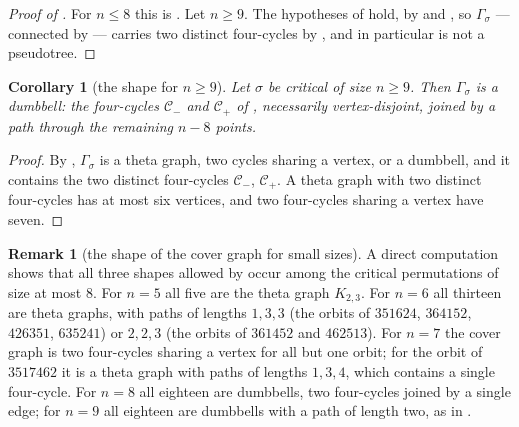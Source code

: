 \documentclass[12pt]{article}
\newtheorem{corollary}[corollary]{Corollary}
\theoremstyle{definition}
\newtheorem{remark}[remark]{Remark}
\newcommand{\cyclem}{\mathcal{C}_-}
\newcommand{\cyclep}{\mathcal{C}_+}
\newcommand{\cgr}{\Gamma}                 %
\begin{document}
\begin{proof}[Proof of ]
For $n \le 8$ this is . Let $n \ge 9$. The hypotheses of
 hold, by  and
, so $\cgr_\sigma$ --- connected by
 --- carries two distinct four-cycles by
, and in particular is not a pseudotree.
\end{proof}

\begin{corollary}[the shape for $n \ge 9$]\label{cor:dumbbell}
Let $\sigma$ be critical of size $n \ge 9$. Then $\cgr_\sigma$ is a dumbbell:
the four-cycles $\cyclem$ and $\cyclep$ of , necessarily
vertex-disjoint, joined by a path through the remaining $n-8$ points.
\end{corollary}

\begin{proof}
By , $\cgr_\sigma$ is a theta graph, two cycles sharing a
vertex, or a dumbbell, and it contains the two distinct four-cycles $\cyclem$,
$\cyclep$. A theta graph with two distinct four-cycles has at most six
vertices, and two four-cycles sharing a vertex have seven.
\end{proof}

\begin{remark}[the shape of the cover graph for small sizes]\label{rem:smallshape}
A direct computation shows that all three shapes allowed by
 occur among the critical permutations of
size at most $8$. For $n = 5$ all five are the theta graph $K_{2,3}$. For
$n = 6$ all thirteen are theta graphs, with paths of lengths $1,3,3$ (the
orbits of $351624$, $364152$, $426351$, $635241$) or $2,2,3$ (the orbits of
$361452$ and $462513$). For $n = 7$ the cover graph is two four-cycles
sharing a vertex for all but one orbit; for the orbit of $3517462$ it is a theta graph with paths of
lengths $1,3,4$, which contains a single four-cycle. For $n = 8$ all
eighteen are dumbbells, two four-cycles joined by a single edge; for $n = 9$
all eighteen are dumbbells with a path of length two, as in
.
\end{remark}
\end{document}
